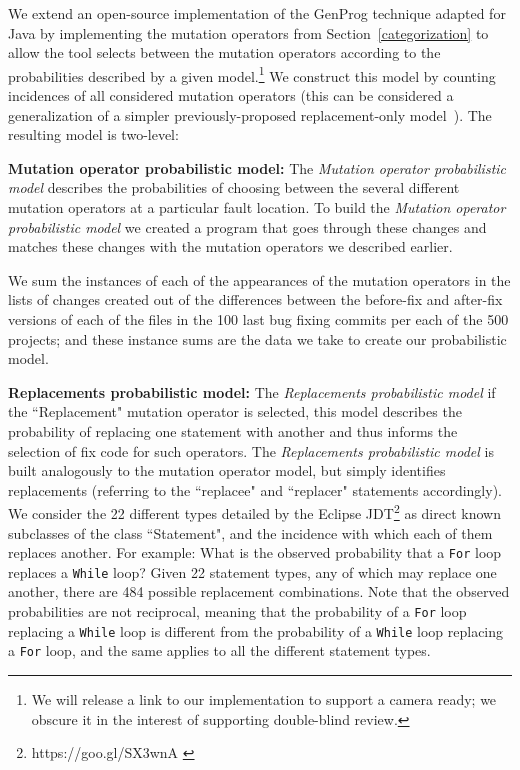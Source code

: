\documentclass[conference]{IEEEtran}
\begin{document}
We extend an open-source implementation of the GenProg technique adapted for Java
by implementing the mutation operators from
Section~\ref{categorization} to allow the tool 
selects between the mutation operators according to the probabilities described by
a given model.\footnote{We will release a link to our implementation to support
  a camera ready; we obscure it in the interest of supporting double-blind
  review.}  We construct this model by counting incidences of all considered
mutation operators (this can be considered a generalization of a simpler
previously-proposed replacement-only model~\cite{Soto15}). The resulting model
is two-level: 

\textbf{Mutation operator probabilistic model:}
The \textit{Mutation operator probabilistic model} 
describes the probabilities of choosing between the several different mutation 
operators at a particular fault location.
%
To build the \textit{Mutation operator probabilistic model} we created 
a program that goes through these 
changes and matches these changes with the mutation operators we described 
earlier.

We sum the instances of each of the appearances of the mutation operators in the 
lists of changes created out of the differences between the before-fix and 
after-fix versions of each of the files in the 100 last bug fixing commits per 
each of the 500 projects; and these instance sums are the data we take to create 
our probabilistic model.

\textbf{Replacements probabilistic model:}
The \textit{Replacements probabilistic model}
if the ``Replacement" mutation operator is 
selected, this model describes the probability of replacing one statement with
another and thus informs the selection of fix code for such operators.
The \textit{Replacements probabilistic model} is built analogously to the
mutation operator model, 
but simply identifies replacements (referring to the 
``replacee" and ``replacer" statements accordingly).
%
We consider 
the 22 different types detailed by the Eclipse JDT\footnote{https://goo.gl/SX3wnA \label{stmtNames}} as
direct known subclasses of the class ``Statement", and the incidence with which
each of  
them replaces another. For example: What is the observed probability that a \texttt{For} loop 
replaces a \texttt{While} loop? Given 22 statement types, any of which may replace one
another, there are 484 possible replacement combinations. 
Note that the observed probabilities are not reciprocal, meaning 
that the probability of a \texttt{For} loop replacing a \texttt{While} loop is different from the 
probability of a \texttt{While} loop replacing a \texttt{For} loop, and the same applies to all 
the different statement types.
\end{document}
